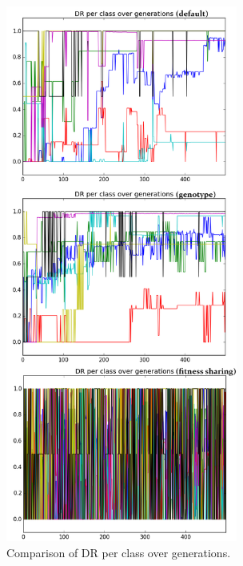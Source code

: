 \documentclass[journal]{IEEEtran}
\begin{document}
\begin{figure}[!t]
  \centering
  \captionsetup{justification=centering}
  \includegraphics[width=3.0in]{images/recalls}
  \caption{Comparison of DR per class over generations.}
  \label{fig:recalls}
\end{figure}
\end{document}
